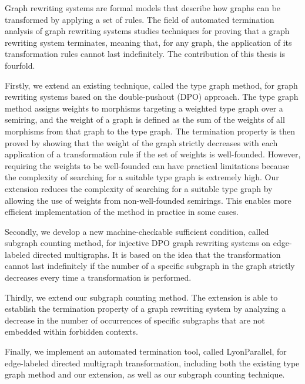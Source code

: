 Graph rewriting systems are formal models that describe how graphs can be transformed by applying a set of rules. The field of automated termination analysis of graph rewriting systems studies techniques for proving that a graph rewriting system terminates, meaning that, for any graph, the application of its transformation rules cannot last indefinitely. The contribution of this thesis is fourfold.

Firstly, we extend an existing technique, called the type graph method, for graph rewriting systems based on the double-pushout (DPO) approach. The type graph method assigns weights to morphisms targeting a weighted type graph over a semiring, and the weight of a graph is defined as the sum of the weights of all morphisms from that graph to the type graph. The termination property is then proved by showing that the weight of the graph strictly decreases with each application of a transformation rule if the set of weights is well-founded. However, requiring the weights to be well-founded can have practical limitations because the complexity of searching for a suitable type graph is extremely high.
Our extension reduces the complexity of searching for a suitable type graph by allowing the use of weights from non-well-founded semirings. This enables more efficient implementation of the method in practice in some cases.

Secondly, we develop a new machine-checkable sufficient condition, called subgraph counting method, for injective DPO graph rewriting systems on edge-labeled directed multigraphs. It is based on the idea that the transformation cannot last indefinitely if the number of a specific subgraph in the graph strictly decreases every time a transformation is performed.

Thirdly, we extend our subgraph counting method. The extension is able to establish the termination property of a graph rewriting system by analyzing a decrease in the number of occurrences of specific subgraphs that are not embedded within forbidden contexts. 

Finally, we implement an automated termination tool, called LyonParallel, for edge-labeled directed multigraph transformation, including both the existing
type graph method and our extension, as well as our subgraph counting technique. 







